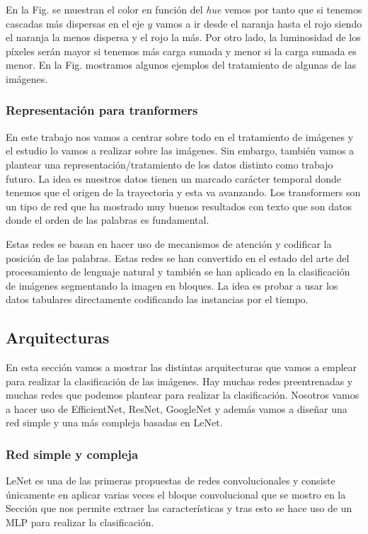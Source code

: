 \documentclass[a4paper,12pt,twoside,titlepage]{article}
\begin{document}
En la Fig. se muestran el color en función del \textit{hue} vemos por tanto que si tenemos cascadas más dispersas en el eje $y$ vamos a ir desde el naranja hasta el rojo siendo el naranja la menos dispersa y el rojo la más. Por otro lado, la luminosidad de los píxeles serán mayor si tenemos más carga sumada y menor si la carga sumada es menor. En la Fig. mostramos algunos ejemplos del tratamiento de algunas de las imágenes.


\subsubsection*{Representación para tranformers}

En este trabajo nos vamos a centrar sobre todo en el tratamiento de imágenes y el estudio lo vamos a realizar sobre las imágenes. Sin embargo, también vamos a plantear una representación/tratamiento de los datos distinto como trabajo futuro. La idea es nuestros datos tienen un marcado carácter temporal donde tenemos que el origen de la trayectoria y esta va avanzando. Los transformers son un tipo de red que ha mostrado muy buenos resultados con texto que son datos donde el orden de las palabras es fundamental. 

Estas redes se basan en hacer uso de mecanismos de atención y codificar la posición de las palabras. Estas redes se han convertido en el estado del arte del procesamiento de lenguaje natural y también se han aplicado en la clasificación de imágenes segmentando la imagen en bloques. La idea es probar a usar los datos tabulares directamente codificando las instancias por el tiempo.

\subsection{Arquitecturas}

En esta sección vamos a mostrar las distintas arquitecturas que vamos a emplear para realizar la clasificación de las imágenes. Hay muchas redes preentrenadas y muchas redes que podemos plantear para realizar la clasificación. Nosotros vamos a hacer uso de EfficientNet, ResNet, GoogleNet y además vamos a diseñar una red simple y una más compleja basadas en LeNet.

\subsubsection*{Red simple y compleja}

LeNet es una de las primeras propuestas de redes convolucionales \cite{} y consiste únicamente en aplicar varias veces el bloque convolucional que se mostro en la Sección que nos permite extraer las características y tras esto se hace uso de un MLP para realizar la clasificación.
\end{document}
